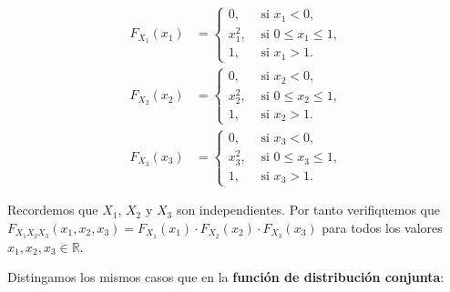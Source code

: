 \documentclass[]{book}
\begin{document}
\[
\begin{array}{rl}
F_{X_1}(x_1) & =\begin{cases}
0, & \mbox{ si }x_1<0, \\
x_1^2, & \mbox{ si }0\leq x_1\leq 1,\\
1, & \mbox{ si }x_1 > 1.
\end{cases}\\
F_{X_2}(x_2) & =\begin{cases}
0, & \mbox{ si }x_2<0, \\
x_2^2, & \mbox{ si }0\leq x_2\leq 1,\\
1, & \mbox{ si }x_2 > 1.
\end{cases}\\ F_{X_3}(x_3) & =\begin{cases}
0, & \mbox{ si }x_3<0, \\
x_3^2, & \mbox{ si }0\leq x_3\leq 1,\\
1, & \mbox{ si }x_3 > 1.
\end{cases}
\end{array}
\]

Recordemos que \(X_1\), \(X_2\) y \(X_3\) son independientes. Por tanto verifiquemos que \(F_{X_1X_2X_3}(x_1,x_2,x_3)=F_{X_1}(x_1)\cdot F_{X_2}(x_2)\cdot F_{X_3}(x_3)\) para todos los valores \(x_1,x_2,x_3\in\mathbb{R}\).

Distingamos los mismos casos que en la \textbf{función de distribución conjunta}:
\end{document}
